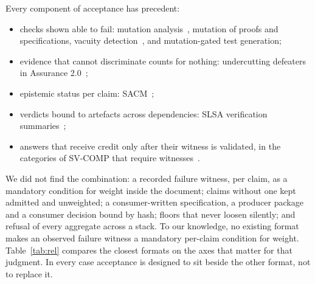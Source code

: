 \documentclass[11pt]{article}
\theoremstyle{definition}
\theoremstyle{remark}
\begin{document}
Every component of acceptance has precedent:
\begin{itemize}[itemsep=1pt]
\item checks shown able to fail: mutation analysis~\cite{demillo1978}, mutation of proofs and
  specifications, vacuity detection~\cite{beer2001,kupferman1999}, and mutation-gated test
  generation;
\item evidence that cannot discriminate counts for nothing: undercutting defeaters in Assurance
  2.0~\cite{bloomfield2022,bloomfield2024};
\item epistemic status per claim: SACM~\cite{sacm23};
\item verdicts bound to artefacts across dependencies: SLSA verification summaries~\cite{slsa};
\item answers that receive credit only after their witness is validated, in the categories of
  SV-COMP that require witnesses~\cite{svcomp2026}.
\end{itemize}
We did not find the combination: a recorded failure witness, per claim, as a mandatory condition
for weight inside the document; claims without one kept admitted and unweighted; a
consumer-written specification, a producer package and a consumer decision bound by hash; floors
that never loosen silently; and refusal of every aggregate across a stack. To our knowledge, no
existing format makes an observed failure witness a mandatory per-claim condition for weight.
Table~\ref{tab:rel} compares the closest formats on the axes that matter for that judgment. In
every case acceptance is designed to sit beside the other format, not to replace it.
\end{document}
